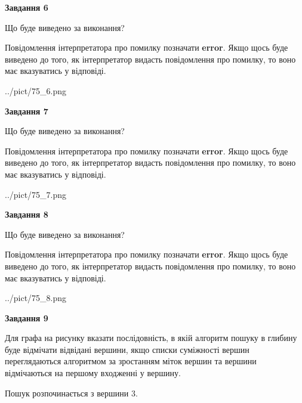 \documentclass[12pt, ukrainian]{article}
\begin{document}
{\begin {large}
{\begin {center}\textbf{Завдання 6}\end {center}}\par
Що буде виведено за виконання?

Повідомлення інтерпретатора про помилку позначати \textbf{error}.
Якщо щось буде виведено до того, як інтерпретатор видасть повідомлення про помилку, 
то воно має вказуватись у відповіді. \par


\begin{center}
	{../pict/75_6.png}
\end{center}
\newpage

{\begin {center}\textbf{Завдання 7}\end {center}}\par
Що буде виведено за виконання?

Повідомлення інтерпретатора про помилку позначати \textbf{error}.
Якщо щось буде виведено до того, як інтерпретатор видасть повідомлення про помилку, 
то воно має вказуватись у відповіді. \par


\begin{center}
	{../pict/75_7.png}
\end{center}
\newpage

{\begin {center}\textbf{Завдання 8}\end {center}}\par
Що буде виведено за виконання?

Повідомлення інтерпретатора про помилку позначати \textbf{error}.
Якщо щось буде виведено до того, як інтерпретатор видасть повідомлення про помилку, 
то воно має вказуватись у відповіді. \par


\begin{center}
	{../pict/75_8.png}
\end{center}
\newpage

{\begin {center}\textbf{Завдання 9}\end {center}}\par
Для графа на рисунку вказати послідовність, в якій алгоритм пошуку в глибину буде відмічати відвідані вершини, якщо списки суміжності вершин переглядаються алгоритмом за зростанням міток вершин та вершини відмічаються на першому вход\-женні у вершину.\par
Пошук розпочинається з вершини 3.\par


\end{large}}
\end{document}
